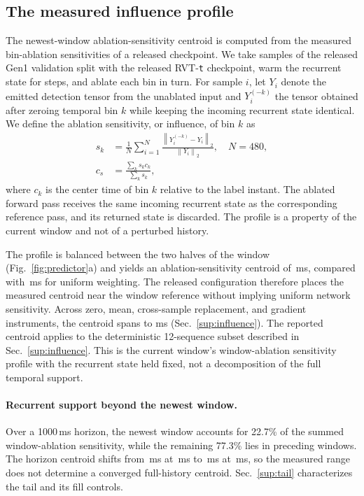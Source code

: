 \documentclass[10pt,twocolumn,letterpaper]{article}
\begin{document}
\subsection{The measured influence profile}
\label{sec:influence}

The newest-window ablation-sensitivity centroid is computed from the measured
bin-ablation sensitivities of a released checkpoint. We take \rvtInfluenceSamples{} samples of the released Gen1
validation split with the released RVT-\texttt{t} checkpoint, warm the recurrent
state for \rvtWarmSteps{} steps, and ablate each bin in turn. For sample $i$, let
$Y_i$ denote the emitted detection tensor from the unablated input and
$Y_i^{(-k)}$ the tensor obtained after zeroing temporal bin $k$ while keeping the
incoming recurrent state identical. We define the ablation sensitivity, or influence, of bin $k$ as
\begin{equation}
\begin{aligned}
s_k&=\frac{1}{N}\sum_{i=1}^{N}
\frac{\left\|Y_i^{(-k)}-Y_i\right\|_2}{\left\|Y_i\right\|_2},\quad N=480,\\
c_s&=\frac{\sum_k s_k c_k}{\sum_k s_k},
\end{aligned}
\end{equation}
where $c_k$ is the center time of bin $k$ relative to the label instant. The
ablated forward pass receives the same incoming recurrent state as the
corresponding reference pass, and its returned state is discarded. The profile is
a property of the current window and not of a perturbed history.

The profile is balanced between the two halves of the window (Fig.~\ref{fig:predictor}a)
and yields an ablation-sensitivity centroid of \rvtCentroidMeas\,ms, compared
with \rvtCentroidUnif\,ms for uniform weighting. The released configuration
therefore places the measured centroid near the window reference without implying
uniform network sensitivity.
Across zero, mean, cross-sample replacement, and gradient instruments, the centroid spans
\occMean{} to \occGrad{} ms (Sec.~\ref{sup:influence}).
The reported centroid applies to the deterministic 12-sequence subset described in Sec.~\ref{sup:influence}.
This is the current window's window-ablation sensitivity profile with the recurrent
state held fixed, not a decomposition of the full temporal support.

\paragraph{Recurrent support beyond the newest window.}
Over a 1000\,ms horizon, the newest window accounts for 22.7\% of the summed
window-ablation sensitivity, while the remaining 77.3\% lies in preceding windows. The
horizon centroid shifts from
\histCentroidTen\,ms at \histHorizonA\,ms to \histCentroidTwenty\,ms at \histHorizonB\,ms,
so the measured range does not determine a converged full-history centroid. Sec.~\ref{sup:tail}
characterizes the tail and its fill controls.
\end{document}

